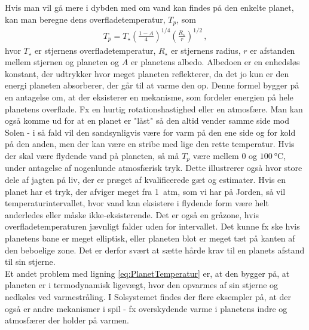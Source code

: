 Hvis man vil gå mere i dybden med om vand kan findes på den enkelte planet, kan man beregne dens overfladetemperatur, $T_p$, som
\begin{align} \label{eq:PlanetTemperatur}
    T_p = T_\star\left(\frac{1-A}{4}\right)^{1/4}\left(\frac{R_\star}{r}\right)^{1/2} \, ,
\end{align}
hvor $T_\star$ er stjernens overfladetemperatur, $R_\star$ er stjernens radius, $r$ er afstanden mellem stjernen og planeten og $A$ er planetens albedo. Albedoen er en enhedsløs konstant, der udtrykker hvor meget planeten reflekterer, da det jo kun er den energi planeten absorberer, der går til at varme den op. Denne formel bygger på en antagelse om, at der eksisterer en mekanisme, som fordeler energien på hele planetens overflade. Fx en hurtig rotationshastighed eller en atmosfære. Man kan også komme ud for at en planet er "låst" så den altid vender samme side mod Solen - i så fald vil den sandsynligvis være for varm på den ene side og for kold på den anden, men der kan være en stribe med lige den rette temperatur. Hvis der skal være flydende vand på planeten, så må $T_p$ være mellem $0$ og $\SI{100}{\degreeCelsius}$, under antagelse af nogenlunde atmosfærisk tryk. Dette illustrerer også hvor store dele af jagten på liv, der er præget af kvalificerede gæt og estimater. Hvis en planet har et tryk, der afviger meget fra \SI{1}{atm}, som vi har på Jorden, så vil temperaturintervallet, hvor vand kan eksistere i flydende form være helt anderledes eller måske ikke-eksisterende. Det er også en gråzone, hvis overfladetemperaturen jævnligt falder uden for intervallet. Det kunne fx ske hvis planetens bane er meget elliptisk, eller planeten blot er meget tæt på kanten af den beboelige zone. Det er derfor svært at sætte hårde krav til en planets afstand til sin stjerne. \\
Et andet problem med ligning \eqref{eq:PlanetTemperatur} er, at den bygger på, at planeten er i termodynamisk ligevægt, hvor den opvarmes af sin stjerne og nedkøles ved varmestråling. I Solsystemet findes der flere eksempler på, at der også er andre mekanismer i spil - fx overskydende varme i planetens indre og atmosfærer der holder på varmen. %
\\

